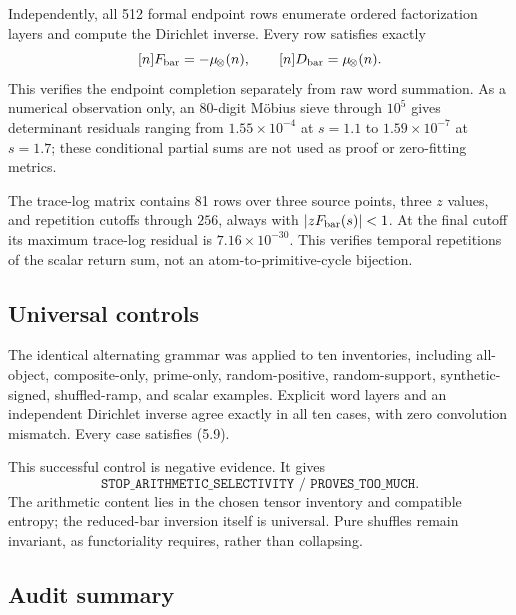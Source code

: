 Independently, all 512 formal endpoint rows enumerate ordered factorization
layers and compute the Dirichlet inverse.  Every row satisfies exactly
\[
  [n]F_{\rm bar}=-\mu_{\!\otimes}(n),
  \qquad
  [n]D_{\rm bar}=\mu_{\!\otimes}(n).
\]
This verifies the endpoint completion separately from raw word summation.
As a numerical observation only, an 80-digit M\"obius sieve through
$10^5$ gives determinant residuals ranging from
$1.55\times10^{-4}$ at $s=1.1$ to $1.59\times10^{-7}$ at $s=1.7$; these
conditional partial sums are not used as proof or zero-fitting metrics.

The trace-log matrix contains 81 rows over three source points, three $z$
values, and repetition cutoffs through $256$, always with
$|zF_{\rm bar}(s)|<1$.  At the final cutoff its maximum trace-log residual is
$7.16\times10^{-30}$.  This verifies temporal repetitions of the scalar
return sum, not an atom-to-primitive-cycle bijection.

\subsection{Universal controls}

The identical alternating grammar was applied to ten inventories, including
all-object, composite-only, prime-only, random-positive, random-support,
synthetic-signed, shuffled-ramp, and scalar examples.  Explicit word layers
and an independent Dirichlet inverse agree exactly in all ten cases, with
zero convolution mismatch.  Every case satisfies (5.9).

This successful control is negative evidence.  It gives
\[
  \texttt{STOP\_ARITHMETIC\_SELECTIVITY / PROVES\_TOO\_MUCH}.
\]
The arithmetic content lies in the chosen tensor inventory and compatible
entropy; the reduced-bar inversion itself is universal.  Pure shuffles remain
invariant, as functoriality requires, rather than collapsing.

\subsection{Audit summary}

